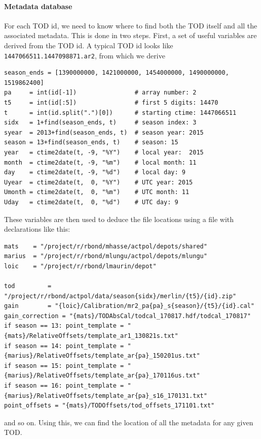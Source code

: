 \documentclass[a4paper, 11pt]{article}
\begin{document}
\paragraph{Metadata database}
For each TOD id, we need to know where to find both the TOD itself and all the associated metadata.
This is done in two steps. First, a set of useful variables are derived from the TOD id. A typical
TOD id looks like \texttt{1447066511.1447098871.ar2}, from which we derive
\begin{verbatim}
season_ends = [1390000000, 1421000000, 1454000000, 1490000000, 1519862400]
pa     = int(id[-1])                # array number: 2
t5     = int(id[:5])                # first 5 digits: 14470
t      = int(id.split(".")[0])      # starting ctime: 1447066511
sidx   = 1+find(season_ends, t)     # season index: 3
syear  = 2013+find(season_ends, t)  # season year: 2015
season = 13+find(season_ends, t)    # season: 15
year   = ctime2date(t, -9, "%Y")    # local year:  2015
month  = ctime2date(t, -9, "%m")    # local month: 11
day    = ctime2date(t, -9, "%d")    # local day: 9
Uyear  = ctime2date(t,  0, "%Y")    # UTC year: 2015
Umonth = ctime2date(t,  0, "%m")    # UTC month: 11
Uday   = ctime2date(t,  0, "%d")    # UTC day: 9
\end{verbatim}
These variables are then used to deduce the file locations using a file with declarations like this:
\begin{verbatim}
mats    = "/project/r/rbond/mhasse/actpol/depots/shared"
marius  = "/project/r/rbond/mlungu/actpol/depots/mlungu"
loic    = "/project/r/rbond/lmaurin/depot"

tod         = "/project/r/rbond/actpol/data/season{sidx}/merlin/{t5}/{id}.zip"
gain        = "{loic}/Calibration/mr2_pa{pa}_s{season}/{t5}/{id}.cal"
gain_correction = "{mats}/TODAbsCal/todcal_170817.hdf/todcal_170817"
if season == 13: point_template = "{mats}/RelativeOffsets/template_ar1_130821s.txt"
if season == 14: point_template = "{marius}/RelativeOffsets/template_ar{pa}_150201us.txt"
if season == 15: point_template = "{marius}/RelativeOffsets/template_ar{pa}_170116us.txt"
if season == 16: point_template = "{marius}/RelativeOffsets/template_ar{pa}_s16_170131.txt"
point_offsets = "{mats}/TODOffsets/tod_offsets_171101.txt"
\end{verbatim}
and so on. Using this, we can find the location of all the metadata for any given TOD.
\end{document}
